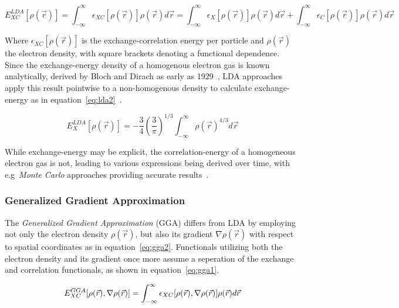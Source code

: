 \documentclass[11pt]{article}
\begin{document}
\begin{equation}
  E_{XC}^{LDA}[\rho(\vec{r})] = \int_{-\infty}^{\infty} \epsilon_{XC}[\rho(\vec{r})]\rho(\vec{r})d\vec{r} = \int_{-\infty}^{\infty} \epsilon_{X}[\rho(\vec{r})]\rho(\vec{r})d\vec{r} + \int_{-\infty}^{\infty} \epsilon_{C}[\rho(\vec{r})]\rho(\vec{r})d\vec{r}
  \label{eq:lda}
\end{equation}

\bigskip

\noindent Where $\epsilon_{XC}[\rho(\vec{r})]$ is the exchange-correlation energy per particle and $\rho(\vec{r})$ the electron density, with square brackets denoting a functional dependence.
Since the exchange-energy density of a homogenous electron gas is known analytically, derived by Bloch and Dirach as early as 1929~\cite{Bloch1929}\cite{Dirac1930}, LDA approaches apply this result pointwise to a non-homogenous density to calculate exchange-energy as in equation~\ref{eq:lda2}~\cite{parr1994density}.

\begin{equation}
  E_X^{LDA}[\rho(\vec{r})] = -\frac{3}{4}\left(\frac{3}{\pi}\right)^{1/3}\int_{-\infty}^{\infty}\rho(\vec{r})^{4/3}d\vec{r}
  \label{eq:lda2}
\end{equation}

\bigskip

\noindent While exchange-energy may be explicit, the correlation-energy of a homogeneous electron gas is not, leading to various expressions being derived over time, with e.g~\textit{Monte Carlo} approaches providing accurate results~\cite{Ceperley1980}.

\subsubsection{Generalized Gradient Approximation}
The \textit{Generalized Gradient Approximation} (GGA) differs from LDA by employing not only the electron density $\rho(\vec{r})$, but also its gradient $\nabla\rho(\vec{r})$ with respect to spatial coordinates as in equation~\ref{eq:gga2}.
Functionals utilizing both the electron density and its gradient once more assume a seperation of the exchange and correlation functionals, as shown in equation~\ref{eq:gga1}.

\begin{equation}
  E_{XC}^{GGA}[\rho(\vec{r}), \nabla\rho(\vec{r})] = \int_{-\infty}^{\infty} \epsilon_{XC}[\rho(\vec{r}), \nabla\rho(\vec{r})]\rho(\vec{r})d\vec{r} \\
\label{eq:gga2}
\end{equation}
\end{document}
